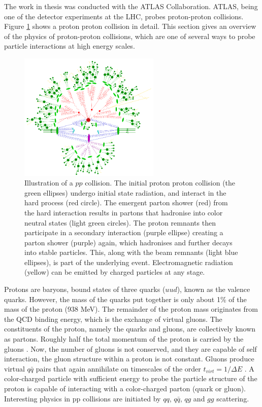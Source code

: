 \documentclass[12pt,a4paper,openright,twoside]{report}
\begin{document}
The work in thesis was conducted with the ATLAS Collaboration. ATLAS, being one of the detector experiments at the LHC, probes proton-proton collisions. Figure \ref{fig:pp} shows a proton proton collision in detail. This section gives an overview of the physics of proton-proton collisions, which are one of several ways to probe particle interactions at high energy scales.

\begin{figure}
\centering
\includegraphics[width=0.6\textwidth]{pp-shower.png}
\caption{Illustration of a $pp$ collision. The initial proton proton collision (the green ellipses) undergo initial state radiation, and interact in the hard process (red circle). The emergent parton shower (red) from the hard interaction results in partons that hadronise into color neutral states (light green circles). The proton remnants then participate in a secondary interaction (purple ellipse) creating a parton shower (purple) again, which hadronises and further decays into stable particles. This, along with the beam remnants (light blue ellipses), is part of the underlying event. Electromagnetic radiation (yellow) can be emitted by charged particles at any stage.}
\label{fig:pp}
\end{figure}

Protons are baryons, bound states of three quarks ($uud$), known as the valence quarks.  However, the mass of the quarks put together is only about 1\% of the mass of the proton (938 MeV). The remainder of the proton mass originates from the QCD binding energy, which is the exchange of virtual gluons. The constituents of the proton, namely the quarks and gluons, are collectively known as partons. Roughly half the total momentum of the proton is carried by the gluons \cite{quarks_and_leptons}. Now, the number of gluons is not conserved, and they are capable of self interaction, the gluon structure within a proton is not constant. Gluons produce virtual $q\bar{q}$ pairs that again annihilate on timescales of the order $t_{virt}=1/\Delta E$ \cite{collider_physics}. A color-charged particle with sufficient energy to probe the particle structure of the proton is capable of interacting with a color-charged parton (quark or gluon). Interesting physics in pp collisions are initiated by $qq$, $q\bar{q}$, $qg$ and $gg$ scattering.
\end{document}
